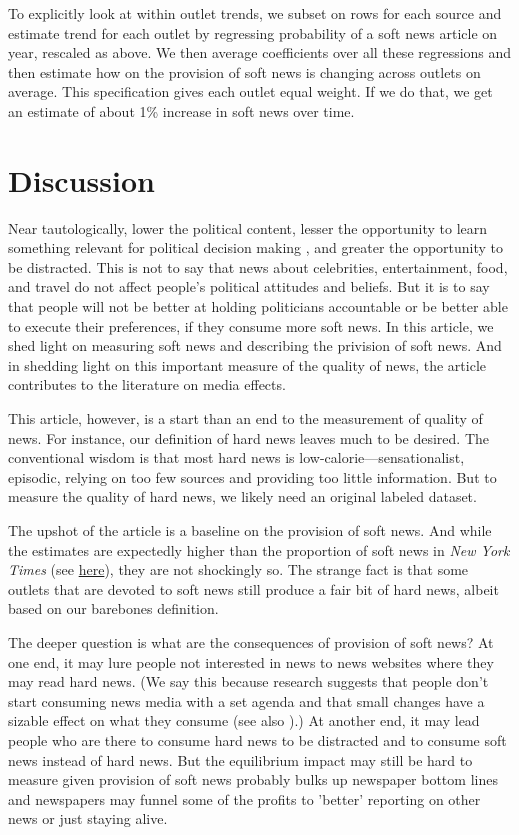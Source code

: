 \documentclass[12pt, letterpaper]{article}
\begin{document}
To explicitly look at within outlet trends, we subset on rows for each source and estimate trend for each outlet by regressing probability of a soft news article on year, rescaled as above. We then average coefficients over all these regressions and then estimate how on the provision of soft news is changing across outlets on average. This specification gives each outlet equal weight. If we do that, we get an estimate of about 1\% increase in soft news over time.

\section*{Discussion}
Near tautologically, lower the political content, lesser the opportunity to learn something relevant for political decision making \citep{prior2003, curran2009media}, and greater the opportunity to be distracted. This is not to say that news about celebrities, entertainment, food, and travel do not affect people's political attitudes and beliefs. But it is to say that people will not be better at holding politicians accountable or be better able to execute their preferences, if they consume more soft news. In this article, we shed light on measuring soft news and describing the privision of soft news. And in shedding light on this important measure of the quality of news, the article contributes to the literature on media effects.

This article, however, is a start than an end to the measurement of quality of news. For instance, our definition of hard news leaves much to be desired. The conventional wisdom is that most hard news is low-calorie---sensationalist, episodic, relying on too few sources and providing too little information. But to measure the quality of hard news, we likely need an original labeled dataset.

The upshot of the article is a baseline on the provision of soft news. And while the estimates are expectedly higher than the proportion of soft news in \textit{New York Times} (see \href{https://github.com/notnews/good_nyt}{here}), they are not shockingly so. The strange fact is that some outlets that are devoted to soft news still produce a fair bit of hard news, albeit based on our barebones definition.

The deeper question is what are the consequences of provision of soft news? At one end, it may lure people not interested in news to news websites where they may read hard news. (We say this because research suggests that people don't start consuming news media with a set agenda and that small changes have a sizable effect on what they consume \citep{martin2017bias} (see also \citep{sood2018dont}).) At another end, it may lead people who are there to consume hard news to be distracted and to consume soft news instead of hard news. But the equilibrium impact may still be hard to measure given provision of soft news probably bulks up newspaper bottom lines and newspapers may funnel some of the profits to 'better' reporting on other news or just staying alive.
\end{document}
